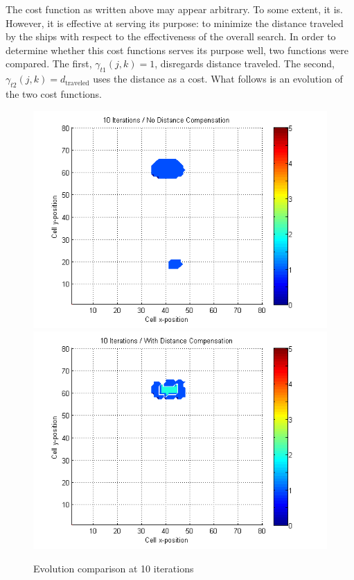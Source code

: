 \documentclass[a4paper]{article}
\begin{document}
The cost function as written above may appear arbitrary. To some extent, it is. However, it is effective at serving its purpose: to minimize the distance traveled by the ships with respect to the effectiveness of the overall search. In order to determine whether this cost functions serves its purpose well, two functions were compared. The first, $\gamma_{t1}(j,k)=1$, disregards distance traveled. The second, $\gamma_{t2}(j,k)=d_{\mbox{traveled}}$ uses the distance as a cost. What follows is an evolution of the two cost functions.

\begin{figure}[H]\begin{center}
\includegraphics[scale=0.45]{../Matlab/Images/SearchCountNoDist010.png}
\includegraphics[scale=0.45]{../Matlab/Images/SearchCountDist010.png}
\caption{Evolution comparison at 10 iterations}
\end{center}\end{figure}
\end{document}
